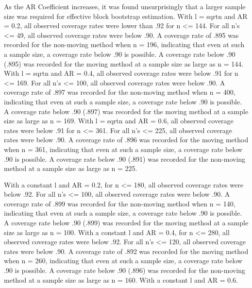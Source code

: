 \documentclass[12pt, letterpaper, titlepage]{article}
\begin{document}
As the AR Coefficient increases, it was found unsurprisingly that a larger sample size was 
required for effective block bootstrap estimation. With l = sqrt{n} and AR = 0.2, all 
observed coverage rates were lower than .92 for n <= 144. For all n's <= 49, all observed 
coverage rates were below .90. A coverage rate of .895 was recorded for the non-moving 
method when n = 196, indicating that even at such a sample size, a coverage rate below .90 
is possible. A coverage rate below .90 (.895) was recorded for the moving method at a 
sample size as large as n = 144. With l = sqrt{n} and AR = 0.4, all observed coverage 
rates were below .91 for n <= 169. For all n's <= 100, all observed coverage rates were 
below .90. A coverage rate of .897 was recorded for the non-moving method when n = 400, 
indicating that even at such a sample size, a coverage rate below .90 is possible. A 
coverage rate below .90 (.897) was recorded for the moving method at a sample size as 
large as n = 169. With l = sqrt{n} and AR = 0.6, all observed coverage rates were below 
.91 for n <= 361. For all n's <= 225, all observed coverage rates were below .90. A 
coverage rate of .896 was recorded for the moving method when n = 361, indicating that 
even at such a sample size, a coverage rate below .90 is possible. A coverage rate below 
.90 (.891) was recorded for the non-moving method at a sample size as large as n = 225.

With a constant l and AR = 0.2, for n <= 180, all observed coverage rates were below .92. 
For all n's <= 100, all observed coverage rates were below .90. A coverage rate of .899 
was recorded for the non-moving method when n = 140, indicating that even at such a sample 
size, a coverage rate below .90 is possible. A coverage rate below .90 (.899) was recorded 
for the moving method at a sample size as large as n = 100. With a constant l and AR = 
0.4, for n <= 280, all observed coverage rates were below .92. For all n's <= 120, all 
observed coverage rates were below .90. A coverage rate of .892 was recorded for the 
moving method when n = 260, indicating that even at such a sample size, a coverage rate 
below .90 is possible. A coverage rate below .90 (.896) was recorded for the non-moving 
method at a sample size as large as n = 160. With a constant l and AR = 0.6.
\end{document}

